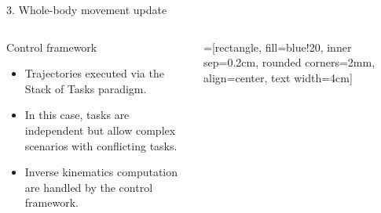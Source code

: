 \documentclass[hyperref={pdfpagelabels=false}]{beamer}
\begin{document}
\begin{frame}{3. Whole-body movement update}
  \begin{columns}
    \begin{column}{0.5\textwidth}
      \begin{block}{Control framework}
        \begin{itemize}
          \item Trajectories executed via the Stack of Tasks paradigm.
          \item In this case, tasks are independent but allow complex
            scenarios with conflicting tasks.
          \item Inverse kinematics computation are handled by the
            control framework.
        \end{itemize}
      \end{block}
    \end{column}

    \begin{column}{0.5\textwidth}

      \begin{center}
        =[rectangle,
          fill=blue!20,
          inner sep=0.2cm,
          rounded corners=2mm,
          align=center,
          text width=4cm]

      \end{center}
    \end{column}
  \end{columns}
\end{frame}
\end{document}
